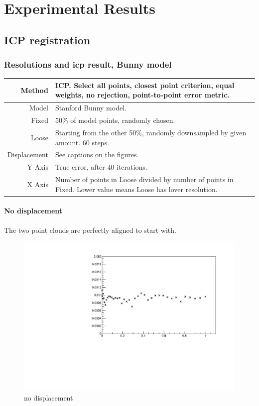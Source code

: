 \chapter{Experimental Results}

\section{ICP registration}

\subsection{Resolutions and \gls{icp} result, Bunny model} \label{sec:ex_bunny_hilo}
\begin{tabularx}{\textwidth}{|r|X|} \hline
Method & ICP. Select all points, closest point criterion, equal weights, no rejection, point-to-point error metric. \\ \hline
Model & Stanford Bunny model. \\ \hline
Fixed & 50\% of model points, randomly chosen. \\ \hline
Loose & Starting from the other 50\%, randomly downsampled by given amount. $60$ steps. \\ \hline
Displacement & See captions on the figures. \\ \hline
Y Axis & True error, after $40$ iterations. \\\hline
X Axis & Number of points in Loose divided by number of points in Fixed. Lower value means Loose has lover resolution. \\ \hline
\end{tabularx}

\subsubsection{No displacement}
The two point clouds are perfectly aligned to start with.

\begin{figure}[H]
\centering
\includegraphics[width=.7\textwidth]{fig/bunny_globmin.pdf}
\caption{no displacement}
\label{fig:bunny_globmin}
\end{figure}


